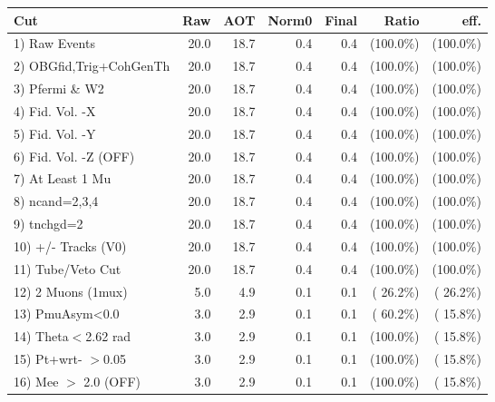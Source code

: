  \begin{table}[h!]\centering
 \begin{tabular}{||l||r|r|r|r|r|r||}
 \hline
 \hline
 Cut & Raw & AOT & Norm0 & Final & Ratio & eff.       \\
 \hline
  1) Raw Events           &         20.0 &         18.7 &          0.4 &          0.4 & (100.0\%) & (100.0\%) \\
  2) OBGfid,Trig+CohGenTh &         20.0 &         18.7 &          0.4 &          0.4 & (100.0\%) & (100.0\%) \\
  3) Pfermi \& W2         &         20.0 &         18.7 &          0.4 &          0.4 & (100.0\%) & (100.0\%) \\
  4) Fid. Vol. -X         &         20.0 &         18.7 &          0.4 &          0.4 & (100.0\%) & (100.0\%) \\
  5) Fid. Vol. -Y         &         20.0 &         18.7 &          0.4 &          0.4 & (100.0\%) & (100.0\%) \\
  6) Fid. Vol. -Z (OFF)   &         20.0 &         18.7 &          0.4 &          0.4 & (100.0\%) & (100.0\%) \\
  7) At Least 1 Mu        &         20.0 &         18.7 &          0.4 &          0.4 & (100.0\%) & (100.0\%) \\
  8) ncand=2,3,4          &         20.0 &         18.7 &          0.4 &          0.4 & (100.0\%) & (100.0\%) \\
  9) tnchgd=2             &         20.0 &         18.7 &          0.4 &          0.4 & (100.0\%) & (100.0\%) \\
 10) +/- Tracks (V0)      &         20.0 &         18.7 &          0.4 &          0.4 & (100.0\%) & (100.0\%) \\
 11) Tube/Veto Cut        &         20.0 &         18.7 &          0.4 &          0.4 & (100.0\%) & (100.0\%) \\
 12) 2 Muons (1mux)       &          5.0 &          4.9 &          0.1 &          0.1 & ( 26.2\%) & ( 26.2\%) \\
 13) PmuAsym<0.0          &          3.0 &          2.9 &          0.1 &          0.1 & ( 60.2\%) & ( 15.8\%) \\
 14) Theta$<$2.62 rad     &          3.0 &          2.9 &          0.1 &          0.1 & (100.0\%) & ( 15.8\%) \\
 15) Pt+wrt- $>$0.05      &          3.0 &          2.9 &          0.1 &          0.1 & (100.0\%) & ( 15.8\%) \\
 16) Mee $>$ 2.0  (OFF)   &          3.0 &          2.9 &          0.1 &          0.1 & (100.0\%) & ( 15.8\%) \\

\end{tabular}
\end{table}
